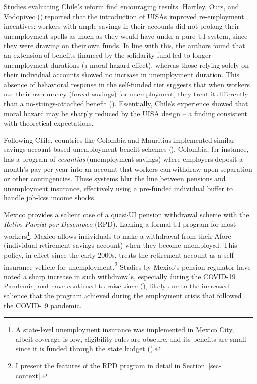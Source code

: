 \documentclass[
  4pt,
]{report}
\begin{document}
Studies evaluating Chile's reform find encouraging results. Hartley,
Ours, and Vodopivec () reported that the
introduction of UISAs improved re-employment incentives: workers with
ample savings in their accounts did not prolong their unemployment
spells as much as they would have under a pure UI system, since they
were drawing on their own funds. In line with this, the authors found
that an extension of benefits financed by the solidarity fund led to
longer unemployment durations (a moral hazard effect), whereas those
relying solely on their individual accounts showed no increase in
unemployment duration. This absence of behavioral response in the
self-funded tier suggests that when workers use their own money
(forced-savings) for unemployment, they treat it differently than a
no-strings-attached benefit (). Essentially, Chile's experience showed that moral hazard may be
sharply reduced by the UISA design -- a finding consistent with
theoretical expectations.

Following Chile, countries like Colombia and Mauritius implemented
similar savings-account-based unemployment benefit schemes
(). Colombia, for instance,
has a program of \emph{cesantías} (unemployment savings) where employers
deposit a month's pay per year into an account that workers can withdraw
upon separation or other contingencies. These systems blur the line
between pensions and unemployment insurance, effectively using a
pre-funded individual buffer to handle job-loss income shocks.

Mexico provides a salient case of a quasi-UI pension withdrawal scheme
with the \emph{Retiro Parcial por Desempleo} (RPD). Lacking a formal UI
program for most workers\footnote{A state-level unemployment insurance
  was implemented in Mexico City, albeit coverage is low, eligibility
  rules are obscure, and its benefits are small since it is funded
  through the state budget ().}, Mexico allows individuals to make a
withdrawal from their Afore (individual retirement savings account) when
they become unemployed. This policy, in effect since the early 2000s,
treats the retirement account as a self-insurance vehicle for
unemployment.\footnote{I present the features of the RPD program in
  detail in Section~\ref{sec-context}.} Studies by Mexico's pension
regulator have noted a sharp increase in such withdrawals, especially
during the COVID-19 Pandemic, and have continued to raise since
(), likely due to the increased
salience that the program achieved during the employment crisis that
followed the COVID-19 pandemic.
\end{document}
